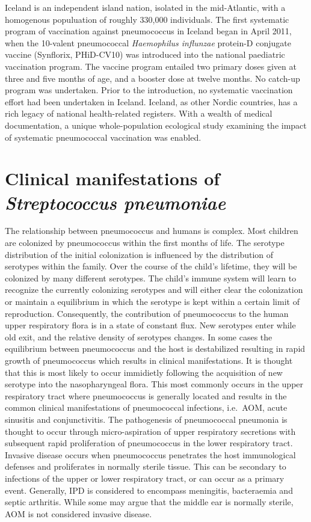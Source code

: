 \documentclass[]{book}
\theoremstyle{definition}
\theoremstyle{definition}
\theoremstyle{definition}
\theoremstyle{remark}
\begin{document}
Iceland is an independent island nation, isolated in the mid-Atlantic,
with a homogenous populuation of roughly 330,000 individuals. The first
systematic program of vaccination against pneumococcus in Iceland began
in April 2011, when the 10-valent pneumococcal \emph{Haemophilus
influnzae} protein-D conjugate vaccine (Synflorix, PHiD-CV10) was
introduced into the national paediatric vaccination program. The vaccine
program entailed two primary doses given at three and five months of
age, and a booster dose at twelve months. No catch-up program was
undertaken. Prior to the introduction, no systematic vaccination effort
had been undertaken in Iceland. Iceland, as other Nordic countries, has
a rich legacy of national health-related registers. With a wealth of
medical documentation, a unique whole-population ecological study
examining the impact of systematic pneumococcal vaccination was enabled.

\section{\texorpdfstring{Clinical manifestations of \emph{Streptococcus
pneumoniae}}{Clinical manifestations of Streptococcus pneumoniae}}\label{clinical-manifestations-of-streptococcus-pneumoniae}

The relationship between pneumococcus and humans is complex. Most
children are colonized by pneumococcus within the first months of life.
The serotype distribution of the initial colonization is influenced by
the distribution of serotypes within the family. Over the course of the
child's lifetime, they will be colonized by many different serotypes.
The child's immune system will learn to recognize the currently
colonizing serotypes and will either clear the colonization or maintain
a equilibrium in which the serotype is kept within a certain limit of
reproduction. Consequently, the contribution of pneumococcus to the
human upper respiratory flora is in a state of constant flux. New
serotypes enter while old exit, and the relative density of serotypes
changes. In some cases the equilibrium between pneumococcus and the host
is destabilized resulting in rapid growth of pneumococcus which results
in clinical manifestations. It is thought that this is most likely to
occur immidietly following the acquisition of new serotype into the
nasopharyngeal flora. This most commonly occurs in the upper respiratory
tract where pneumococcus is generally located and results in the common
clinical manifestations of pneumococcal infections, i.e.~AOM, acute
sinusitis and conjunctivitis. The pathogenesis of pneumococcal pneumonia
is thought to occur through micro-aspiration of upper respiratory
secretions with subsequent rapid proliferation of pneumococcus in the
lower respiratory tract. Invasive disease occurs when pneumococcus
penetrates the host immunological defenses and proliferates in normally
sterile tissue. This can be secondary to infections of the upper or
lower respiratory tract, or can occur as a primary event. Generally, IPD
is considered to encompass meningitis, bacteraemia and septic arthritis.
While some may argue that the middle ear is normally sterile, AOM is not
considered invasive disease.
\end{document}
